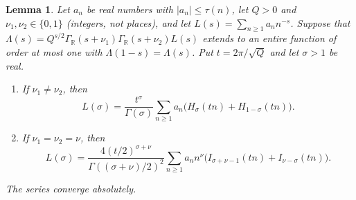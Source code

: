 \documentclass[11pt]{amsart}
\numberwithin{equation}{section}
\newtheorem{lemma}[equation]{Lemma}
\theoremstyle{definition}
\theoremstyle{remark}
\newcommand{\R}{\mathbb R}
\begin{document}
\begin{lemma}\label{an:balanced-afe}
Let $a_n$ be real numbers with $|a_n|\le\tau(n)$, let $Q>0$ and
$\nu_1,\nu_2\in\{0,1\}$ (integers, not places), and let
$L(s)=\sum_{n\ge1}a_nn^{-s}$. Suppose that
$\Lambda(s)=Q^{s/2}\Gamma_\R(s+\nu_1)\Gamma_\R(s+\nu_2)L(s)$ extends to an
entire function of order at most one with $\Lambda(1-s)=\Lambda(s)$. Put
$t=2\pi/\sqrt Q$ and let $\sigma>1$ be real.
\begin{enumerate}
\item If $\nu_1\ne\nu_2$, then
\[
 L(\sigma)=\frac{t^\sigma}{\Gamma(\sigma)}\sum_{n\ge1}a_n
 \bigl(H_\sigma(tn)+H_{1-\sigma}(tn)\bigr).
\]
\item If $\nu_1=\nu_2=\nu$, then
\[
 L(\sigma)=\frac{4(t/2)^{\sigma+\nu}}{\Gamma((\sigma+\nu)/2)^2}
 \sum_{n\ge1}a_nn^\nu
 \bigl(I_{\sigma+\nu-1}(tn)+I_{\nu-\sigma}(tn)\bigr).
\]
\end{enumerate}
The series converge absolutely.
\end{lemma}
\end{document}
